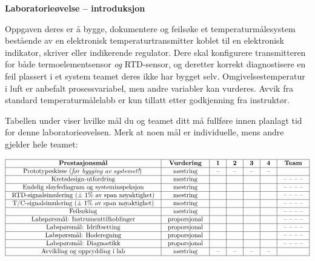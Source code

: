 
\noindent
{\bf Laboratorieøvelse -- introduksjon}

\vskip 5pt

Oppgaven deres er å bygge, dokumentere og feilsøke et temperaturmålesystem bestående av en elektronisk temperaturtransmitter koblet til en elektronisk indikator, skriver eller indikerende regulator. Dere skal konfigurere transmitteren for både termoelementsensor {\it og} RTD-sensor, og deretter korrekt diagnostisere en feil plassert i et system teamet deres ikke har bygget selv. Omgivelsestemperatur i luft er anbefalt prosessvariabel, men andre variabler kan vurderes. Avvik fra standard temperaturmålelabb er kun tillatt etter godkjenning fra instruktør.

Tabellen under viser hvilke mål du og teamet ditt må fullføre innen planlagt tid for denne laboratorieøvelsen. Merk at noen mål er individuelle, mens andre gjelder hele teamet:



$$\vbox{\offinterlineskip
\halign{\strut
\vrule \quad\hfil # \ \hfil & 
\vrule \quad\hfil # \ \hfil & 
\vrule \quad\hfil # \ \hfil & 
\vrule \quad\hfil # \ \hfil & 
\vrule \quad\hfil # \ \hfil & 
\vrule \quad\hfil # \ \hfil & 
\vrule \quad\hfil # \ \hfil \vrule \cr
\noalign{\hrule}
%
{\bf Prestasjonsmål} & {\bf Vurdering} & {\bf 1} & {\bf 2} & {\bf 3} & {\bf 4} & {\bf Team} \cr
%
\noalign{\hrule}
%
Prototypeskisse ({\it før bygging av systemet!}) & mestring & -- & -- & -- & -- & \cr
%
\noalign{\hrule}
%
Kretsdesign-utfordring & mestring & & & & & -- -- -- -- \cr
%
\noalign{\hrule}
%
Endelig sløyfediagram og systeminspeksjon & mestring & & & & & -- -- -- -- \cr
%
\noalign{\hrule}
%
RTD-signalsimulering ($\pm$ 1\% av span nøyaktighet) & mestring & & & & & -- -- -- -- \cr
%
\noalign{\hrule}
%
T/C-signalsimulering ($\pm$ 1\% av span nøyaktighet) & mestring & & & & & -- -- -- -- \cr
%
\noalign{\hrule}
%
Feilsøking & mestring & & & & & -- -- -- -- \cr
%
\noalign{\hrule}
%
Labspørsmål: Instrumenttilkoblinger & proporsjonal &  &  &  &  & -- -- -- -- \cr
%
\noalign{\hrule}
%
Labspørsmål: Idriftsetting & proporsjonal &  &  &  &  & -- -- -- -- \cr
%
\noalign{\hrule}
%
Labspørsmål: Hoderegning & proporsjonal &  &  &  &  & -- -- -- -- \cr
%
\noalign{\hrule}
%
Labspørsmål: Diagnostikk & proporsjonal &  &  &  &  & -- -- -- -- \cr
%
\noalign{\hrule}
%
Avvikling og opprydding i lab & mestring & -- & -- & -- & -- &  \cr
%
\noalign{\hrule}
} %
}$$ %

